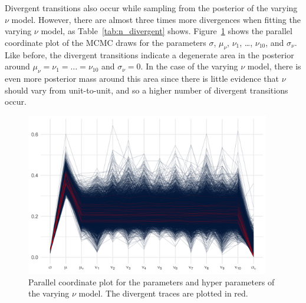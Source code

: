 

Divergent transitions also occur while sampling from the posterior of the varying $\nu$ model. However, there are almost three times more divergences when fitting the varying $\nu$ model, as Table~\ref{tab:n_divergent} shows. Figure~\ref{fig:pp_nu_parcoord} shows the parallel coordinate plot of the MCMC draws for the parameters $\sigma$, $\mu_\nu$, $\nu_1$, \ldots, $\nu_{10}$, and $\sigma_\nu$. Like before, the divergent transitions indicate a degenerate area in the posterior around $\mu_\nu = \nu_1 = \ldots = \nu_{10}$ and $\sigma_\nu = 0$. In the case of the varying $\nu$ model, there is even more posterior mass around this area since there is little evidence that $\nu$ should vary from unit-to-unit, and so a higher number of divergent transitions occur.

\begin{figure}[tbp]
   \centering
   \includegraphics[width=0.95\textwidth]{./figures/ch-5/plot-pp-nu-parcoord.png}
   \caption{Parallel coordinate plot for the parameters and hyper parameters of the varying $\nu$ model. The divergent traces are plotted in red.}
   \label{fig:pp_nu_parcoord} 
\end{figure}


